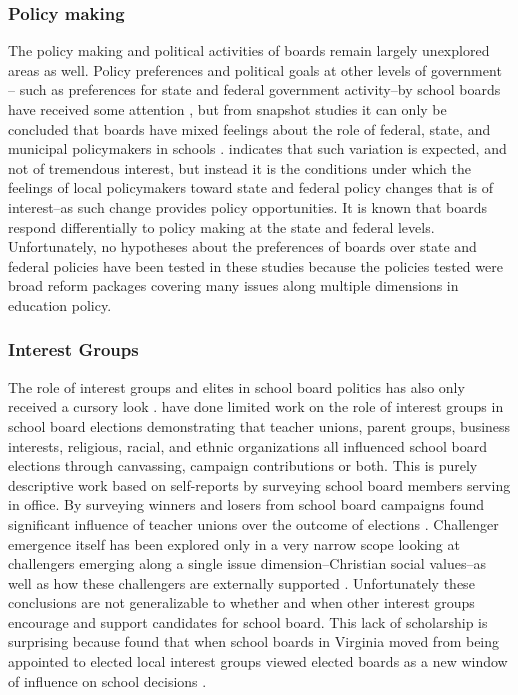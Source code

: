 \subsubsection{Policy making}
The policy making and political activities of boards remain largely unexplored 
areas as well. Policy preferences and political goals at other levels of government 
-- such as preferences for state and federal government activity--by school boards 
have received some attention \citep{RefWorks:258}, but from snapshot studies it 
can only be concluded that boards have mixed feelings about the role of federal, 
state, and municipal policymakers in schools \citep{RefWorks:262}. \citet{RefWorks:318} 
indicates that such variation is expected, and not of tremendous interest, but 
instead it is the conditions under which the feelings of local policymakers toward 
state and federal policy changes that is of interest--as such change provides 
policy opportunities. It is known that boards respond differentially to policy 
making at the state \citep{RefWorks:187} and federal \citep{RefWorks:236} levels. 
Unfortunately, no hypotheses about the preferences of boards over state and federal 
policies have been tested in these studies because the policies tested were broad 
reform packages covering many issues along multiple dimensions in education policy. 


\subsubsection{Interest Groups}
The role of interest groups and elites in school board politics has also only 
received a cursory look \citep{RefWorks:254}. \citet{RefWorks:217} have done 
limited work on the role of interest groups in school board elections 
demonstrating that teacher unions, parent groups, business interests, religious, 
racial, and ethnic organizations all influenced school board elections through 
canvassing, campaign contributions or both. This is purely descriptive work based 
on self-reports by surveying school board members serving in office. By surveying 
winners and losers from school board campaigns \citet{RefWorks:218} found significant 
influence of teacher unions over the outcome of elections 
\citep[see also:][]{RefWorks:320,RefWorks:207}. Challenger emergence itself has 
been explored only in a very narrow scope looking at challengers emerging along 
a single issue dimension--Christian social values--as well as how these challengers 
are externally supported \citep{RefWorks:240,RefWorks:347}. Unfortunately these 
conclusions are not generalizable to whether and when other interest groups encourage 
and support candidates for school board. This lack of scholarship is surprising 
because \citet{RefWorks:242} found that when school boards in Virginia moved from 
being appointed to elected local interest groups viewed elected boards as a new 
window of influence on school decisions \citep[see also][]{RefWorks:315}. 


